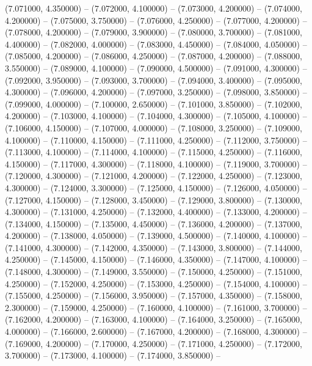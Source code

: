 (7.071000, 4.350000) -- 
(7.072000, 4.100000) -- 
(7.073000, 4.200000) -- 
(7.074000, 4.200000) -- 
(7.075000, 3.750000) -- 
(7.076000, 4.250000) -- 
(7.077000, 4.200000) -- 
(7.078000, 4.200000) -- 
(7.079000, 3.900000) -- 
(7.080000, 3.700000) -- 
(7.081000, 4.400000) -- 
(7.082000, 4.000000) -- 
(7.083000, 4.450000) -- 
(7.084000, 4.050000) -- 
(7.085000, 4.200000) -- 
(7.086000, 4.250000) -- 
(7.087000, 4.200000) -- 
(7.088000, 3.550000) -- 
(7.089000, 4.100000) -- 
(7.090000, 4.500000) -- 
(7.091000, 4.300000) -- 
(7.092000, 3.950000) -- 
(7.093000, 3.700000) -- 
(7.094000, 3.400000) -- 
(7.095000, 4.300000) -- 
(7.096000, 4.200000) -- 
(7.097000, 3.250000) -- 
(7.098000, 3.850000) -- 
(7.099000, 4.000000) -- 
(7.100000, 2.650000) -- 
(7.101000, 3.850000) -- 
(7.102000, 4.200000) -- 
(7.103000, 4.100000) -- 
(7.104000, 4.300000) -- 
(7.105000, 4.100000) -- 
(7.106000, 4.150000) -- 
(7.107000, 4.000000) -- 
(7.108000, 3.250000) -- 
(7.109000, 4.100000) -- 
(7.110000, 4.150000) -- 
(7.111000, 4.250000) -- 
(7.112000, 3.750000) -- 
(7.113000, 4.100000) -- 
(7.114000, 4.100000) -- 
(7.115000, 4.250000) -- 
(7.116000, 4.150000) -- 
(7.117000, 4.300000) -- 
(7.118000, 4.100000) -- 
(7.119000, 3.700000) -- 
(7.120000, 4.300000) -- 
(7.121000, 4.200000) -- 
(7.122000, 4.250000) -- 
(7.123000, 4.300000) -- 
(7.124000, 3.300000) -- 
(7.125000, 4.150000) -- 
(7.126000, 4.050000) -- 
(7.127000, 4.150000) -- 
(7.128000, 3.450000) -- 
(7.129000, 3.800000) -- 
(7.130000, 4.300000) -- 
(7.131000, 4.250000) -- 
(7.132000, 4.400000) -- 
(7.133000, 4.200000) -- 
(7.134000, 4.150000) -- 
(7.135000, 4.450000) -- 
(7.136000, 4.200000) -- 
(7.137000, 4.200000) -- 
(7.138000, 4.050000) -- 
(7.139000, 4.500000) -- 
(7.140000, 4.100000) -- 
(7.141000, 4.300000) -- 
(7.142000, 4.350000) -- 
(7.143000, 3.800000) -- 
(7.144000, 4.250000) -- 
(7.145000, 4.150000) -- 
(7.146000, 4.350000) -- 
(7.147000, 4.100000) -- 
(7.148000, 4.300000) -- 
(7.149000, 3.550000) -- 
(7.150000, 4.250000) -- 
(7.151000, 4.250000) -- 
(7.152000, 4.250000) -- 
(7.153000, 4.250000) -- 
(7.154000, 4.100000) -- 
(7.155000, 4.250000) -- 
(7.156000, 3.950000) -- 
(7.157000, 4.350000) -- 
(7.158000, 2.300000) -- 
(7.159000, 4.250000) -- 
(7.160000, 4.100000) -- 
(7.161000, 3.700000) -- 
(7.162000, 4.200000) -- 
(7.163000, 4.100000) -- 
(7.164000, 3.250000) -- 
(7.165000, 4.000000) -- 
(7.166000, 2.600000) -- 
(7.167000, 4.200000) -- 
(7.168000, 4.300000) -- 
(7.169000, 4.200000) -- 
(7.170000, 4.250000) -- 
(7.171000, 4.250000) -- 
(7.172000, 3.700000) -- 
(7.173000, 4.100000) -- 
(7.174000, 3.850000) -- 
